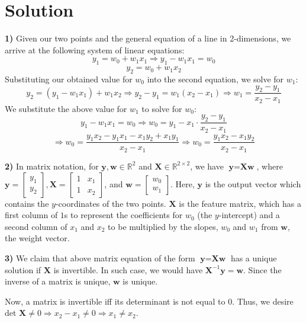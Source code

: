 \documentclass{harvardml}
\theoremstyle{definition}
\theoremstyle{plain}
\newenvironment{solution}
  {\color{blue}\section*{Solution}}
{}
\begin{document}
\begin{solution}
	\textbf{1) }Given our two points and the general equation of a line in 2-dimensions, we arrive at the following system of linear equations:
 $$
 y_{1} = w_{0} + w_{1}x_{1} \Rightarrow y_{1} - w_{1}x_{1} = w_{0}
 $$
 $$
 y_{2} = w_{0} + w_{1}x_{2}
 $$
 Substituting our obtained value for $w_{0}$ into the second equation, we solve for $w_{1}$:
 $$
 y_{2} = (y_{1} - w_{1}x_{1}) + w_{1}x_{2} \Rightarrow y_{2} - y_{1} = w_{1}(x_{2} - x_{1}) \Rightarrow w_{1} = \frac{y_{2} - y_{1}}{x_{2} - x_{1}}
 $$
 We substitute the above value for $w_{1}$ to solve for $w_{0}$:
$$
y_{1} - w_{1}x_{1} = w_{0} \Rightarrow w_{0} = y_{1} - x_{1}\cdot \frac{y_{2} - y_{1}}{x_{2} - x_{1}}
$$
$$
\Rightarrow w_{0} = \frac{y_{1}x_{2} - y_{1}x_{1} - x_{1}y_{2} + x_{1}y_{1}}{x_{2} - x_{1}} \Rightarrow w_{0} = \frac{y_{1}x_{2} - x_{1}y_{2}}{x_{2} - x_{1}}
$$

\textbf{2) } In matrix notation, for $\textbf{y}, \textbf{w} \in \mathbb{R}^{2}$ and $\textbf{X} \in \mathbb{R}^{2 \times 2}$, we have $\textbf{y} = \textbf{X}\textbf{w}$, where $\textbf{y} = \begin{bmatrix}
    y_{1} \\
    y_{2}
\end{bmatrix}, \textbf{X} = \begin{bmatrix}
    1 & x_{1} \\
    1 & x_{2}
\end{bmatrix}$, and $\textbf{w} = \begin{bmatrix}
    w_{0} \\
    w_{1}
\end{bmatrix}.$ Here, $\textbf{y}$ is the output vector which contains the $y$-coordinates of the two points. $\textbf{X}$ is the feature matrix, which has a first column of $1$s to represent the coefficients for $w_{0}$ (the $y$-intercept) and a second column of $x_{1}$ and $x_{2}$ to be multiplied by the slopes, $w_{0}$ and $w_{1}$ from $\textbf{w}$, the weight vector. 

\textbf{3) } We claim that above matrix equation of the form $\textbf{y} = \textbf{X}\textbf{w}$ has a unique solution if $\textbf{X}$ is invertible. In such case, we would have $\textbf{X}^{-1}\textbf{y} = \textbf{w}$. Since the inverse of a matrix is unique, $\textbf{w}$ is unique. 

Now, a matrix is invertible iff its determinant is not equal to 0. Thus, we desire det $\textbf{X} \neq 0 \Rightarrow x_{2} - x_{1} \neq 0 \Rightarrow x_{1} \neq x_{2}$. 


\end{solution}
\end{document}
